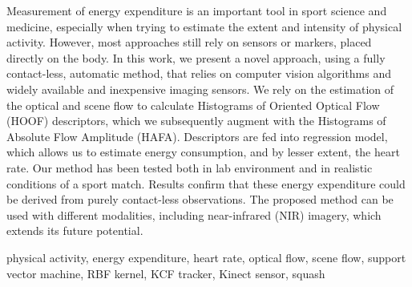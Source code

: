\abstractp
Measurement of energy expenditure is an important tool in sport science and medicine, especially when trying to estimate the extent and intensity of physical activity. However, most approaches still rely on sensors or markers, placed directly on the body. In this work, we present a novel approach, using a fully contact-less, automatic method, that relies on computer vision algorithms and widely available and inexpensive imaging sensors. We rely on the estimation of the optical and scene flow to calculate Histograms of Oriented Optical Flow (HOOF) descriptors, which we subsequently augment with the Histograms of Absolute Flow Amplitude (HAFA). Descriptors are fed into regression model, which allows us to estimate energy consumption, and by lesser extent, the heart rate. Our method has been tested both in lab environment and in realistic conditions of a sport match. Results confirm that these energy expenditure could be derived from purely contact-less observations. The proposed method can be used with different modalities, including near-infrared (NIR) imagery, which extends its future potential.

\keywords physical activity, energy expenditure, heart rate, optical flow, scene flow, support vector machine, RBF kernel, KCF tracker, Kinect sensor, squash
